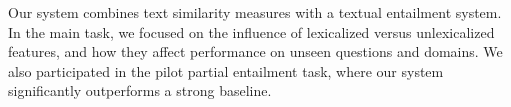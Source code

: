 Our system combines text similarity measures with a textual entailment system. In the main task, we focused on the influence of lexicalized versus
 unlexicalized features, and how they affect performance on unseen questions and
 domains. We also participated in the pilot partial entailment task, where our
 system significantly outperforms a strong baseline.

